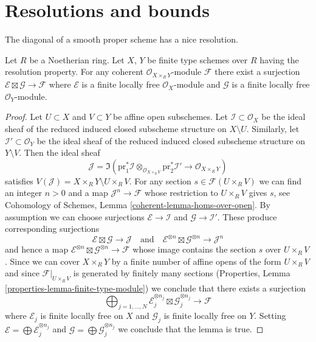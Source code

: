 \section{Resolutions and bounds}
\label{section-tricks-smooth}

\noindent
The diagonal of a smooth proper scheme has a nice resolution.

\begin{lemma}
\label{lemma-on-product}
Let $R$ be a Noetherian ring. Let $X$, $Y$ be finite type schemes over $R$
having the resolution property. For any coherent
$\mathcal{O}_{X \times_R Y}$-module $\mathcal{F}$ there exist
a surjection $\mathcal{E} \boxtimes \mathcal{G} \to \mathcal{F}$
where $\mathcal{E}$ is a finite locally free $\mathcal{O}_X$-module
and $\mathcal{G}$ is a finite locally free $\mathcal{O}_Y$-module.
\end{lemma}

\begin{proof}
Let $U \subset X$ and $V \subset Y$ be affine open subschemes. Let
$\mathcal{I} \subset \mathcal{O}_X$ be the ideal sheaf of the
reduced induced closed subscheme structure on $X \setminus U$.
Similarly, let $\mathcal{I}' \subset \mathcal{O}_Y$ be the ideal sheaf of the
reduced induced closed subscheme structure on $Y \setminus V$.
Then the ideal sheaf
$$
\mathcal{J} = \Im(\text{pr}_1^*\mathcal{I} \otimes_{\mathcal{O}_{X \times_R Y}}
\text{pr}_2^*\mathcal{I}' \to \mathcal{O}_{X \times_R Y})
$$
satisfies $V(\mathcal{J}) = X \times_R Y \setminus U \times_R V$.
For any section $s \in \mathcal{F}(U \times_R V)$ we can find an integer
$n > 0$ and a map $\mathcal{J}^n \to \mathcal{F}$ whose restriction to
$U \times_R V$ gives $s$, see
Cohomology of Schemes, Lemma \ref{coherent-lemma-homs-over-open}.
By assumption we can choose surjections
$\mathcal{E} \to \mathcal{I}$ and $\mathcal{G} \to \mathcal{I}'$.
These produce corresponding surjections
$$
\mathcal{E} \boxtimes \mathcal{G} \to \mathcal{J}
\quad\text{and}\quad
\mathcal{E}^{\otimes n} \boxtimes \mathcal{G}^{\otimes n} \to \mathcal{J}^n
$$
and hence a map
$\mathcal{E}^{\otimes n} \boxtimes \mathcal{G}^{\otimes n} \to \mathcal{F}$
whose image contains the section $s$ over $U \times_R V$.
Since we can cover $X \times_R Y$ by a finite number of affine opens
of the form $U \times_R V$ and since $\mathcal{F}|_{U \times_R V}$
is generated by finitely many sections (Properties, Lemma
\ref{properties-lemma-finite-type-module})
we conclude that there exists a surjection
$$
\bigoplus\nolimits_{j = 1, \ldots, N}
\mathcal{E}_j^{\otimes n_j} \boxtimes \mathcal{G}_j^{\otimes n_j}
\to \mathcal{F}
$$
where $\mathcal{E}_j$ is finite locally free on $X$ and
$\mathcal{G}_j$ is finite locally free on $Y$.
Setting $\mathcal{E} = \bigoplus \mathcal{E}_j^{\otimes n_j}$
and $\mathcal{G} = \bigoplus \mathcal{G}_j^{\otimes n_j}$
we conclude that the lemma is true.
\end{proof}

